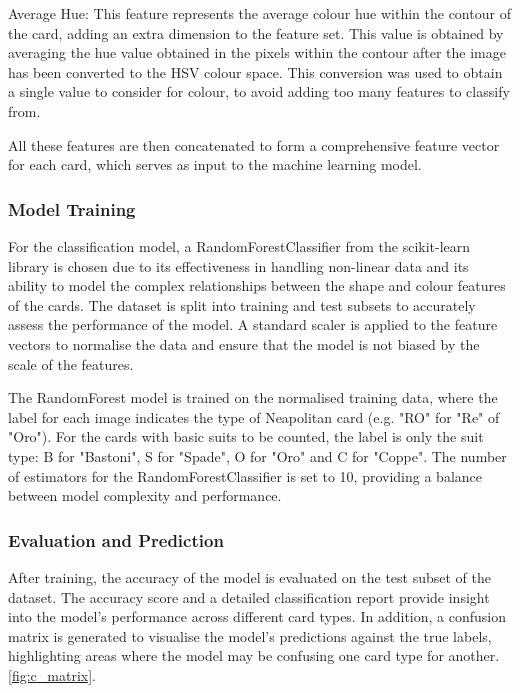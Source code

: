 \documentclass[twocolumn, a4paper,10pt]{article}
\begin{document}
Average Hue: This feature represents the average colour hue within the contour of the card, adding an extra dimension to the feature set. This value is obtained by averaging the hue value obtained in the pixels within the contour after the image has been converted to the HSV colour space.
This conversion was used to obtain a single value to consider for colour, to avoid adding too many features to classify from.

All these features are then concatenated to form a comprehensive feature vector for each card, which serves as input to the machine learning model.

\subsubsection*{Model Training}
For the classification model, a RandomForestClassifier from the scikit-learn library is chosen due to its effectiveness in handling non-linear data and its ability to model the complex relationships between the shape and colour features of the cards. The dataset is split into training and test subsets to accurately assess the performance of the model. A standard scaler is applied to the feature vectors to normalise the data and ensure that the model is not biased by the scale of the features.

The RandomForest model is trained on the normalised training data, where the label for each image indicates the type of Neapolitan card (e.g. "RO" for "Re" of "Oro"). For the cards with basic suits to be counted, the label is only the suit type: B for "Bastoni", S for "Spade", O for "Oro" and C for "Coppe". The number of estimators for the RandomForestClassifier is set to 10, providing a balance between model complexity and performance.

\subsubsection*{Evaluation and Prediction}
After training, the accuracy of the model is evaluated on the test subset of the dataset. The accuracy score and a detailed classification report provide insight into the model's performance across different card types. In addition, a confusion matrix is generated to visualise the model's predictions against the true labels, highlighting areas where the model may be confusing one card type for another. \ref{fig:c_matrix}.
\end{document}
